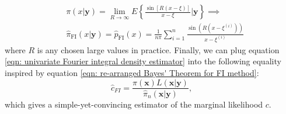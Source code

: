 \documentclass[%
 reprint,
 amsmath,amssymb,
 aps,
]{revtex4-2}
\def\ybold{\mathbf{y}}
\def\xbold{\mathbf{x}}
\begin{document}
\begin{align} \label{eqn: univariate Fourier integral density estimator}
    & \pi(x|\ybold) = \lim_{R \to \infty} E\left\{\frac{\sin[R(x-\xi)]}{x-\xi} \bigg|\ybold\right\} \implies \\ & \hat{\pi}_\text{FI}(x|\ybold) = \hat{p}_\text{FI}(x) = \frac{1}{n\pi}\sum_{i = 1}^n \frac{\sin(R(x - \xi^{(i)}))}{x - \xi^{(i)}}
\end{align}
where $R$ is any chosen large values in practice. Finally, we can plug equation \eqref{eqn: univariate Fourier integral density estimator} into the following equality inspired by equation \eqref{eqn: re-arranged Bayes' Theorem for FI method}:
\begin{equation} \label{eqn: re-arranged Bayes' Theorem for FI method estimator}
    \hat{c}_{FI} = \frac{\pi(\xbold)L(\xbold | \ybold)}{\hat{\pi}_n (\xbold | \ybold)},
\end{equation}
which gives a simple-yet-convincing estimator of the marginal likelihood $c$.
\end{document}
